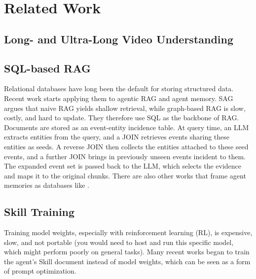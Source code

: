 \section{Related Work}
\label{sec:related}

\subsection{Long- and Ultra-Long Video Understanding}
\label{sec:related-long-video}


\subsection{SQL-based RAG}
\label{sec:related-sql-rag}

Relational databases have long been the default for storing structured data. Recent work starts applying them to agentic RAG and agent memory. SAG \cite{wu_sag_2026} argues that naive RAG yields shallow retrieval, while graph-based RAG is slow, costly, and hard to update. They therefore use SQL as the backbone of RAG. Documents are stored as an event-entity incidence table. At query time, an LLM extracts entities from the query, and a JOIN retrieves events sharing these entities as seeds. A reverse JOIN then collects the entities attached to these seed events, and a further JOIN brings in previously unseen events incident to them. The expanded event set is passed back to the LLM, which selects the evidence and maps it to the original chunks. There are also other works that frame agent memories as databases like \cite{orogat_agent_2026}.

\subsection{Skill Training}
\label{sec:related-skill-training}

Training model weights, especially with reinforcement learning (RL), is expensive, slow, and not portable (you would need to host and run this specific model, which might perform poorly on general tasks). Many recent works began to train the agent's Skill document instead of model weights, which can be seen as a form of prompt optimization.

